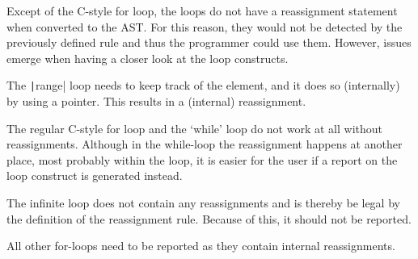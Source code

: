 Except of the C-style for loop, the loops do not have a reassignment statement when
converted to the AST. For this reason, they would not be detected by the previously defined rule and thus
the programmer could use them.
However, issues emerge when having a closer look at the loop constructs.

The \texttt|range| loop needs to keep track of the element, and it does so (internally)
by using a pointer. This results in a (internal) reassignment.

The regular C-style for loop and the `while' loop do not work at all without reassignments.
Although in the while-loop the reassignment happens at another place, most probably within the loop,
it is easier for the user if a report on the loop construct is generated instead.

The infinite loop does not contain any reassignments and is thereby be legal by the
definition of the reassignment rule. Because of this, it should not be reported.

All other for-loops need to be reported as they contain internal reassignments.
